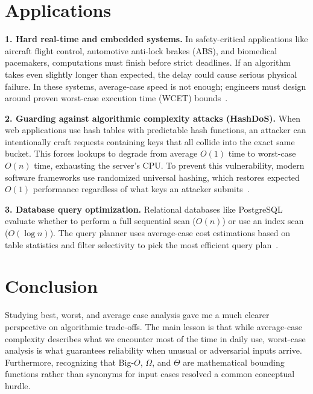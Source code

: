 \documentclass[11pt,a4paper]{article}
\begin{document}
\section{Applications}

\textbf{1. Hard real-time and embedded systems.}
In safety-critical applications like aircraft flight control, automotive anti-lock brakes (ABS), and biomedical pacemakers, computations must finish before strict deadlines. If an algorithm takes even slightly longer than expected, the delay could cause serious physical failure. In these systems, average-case speed is not enough; engineers must design around proven worst-case execution time (WCET) bounds~\cite{kleinberg2006}.

\textbf{2. Guarding against algorithmic complexity attacks (HashDoS).}
When web applications use hash tables with predictable hash functions, an attacker can intentionally craft requests containing keys that all collide into the exact same bucket. This forces lookups to degrade from average $O(1)$ time to worst-case $O(n)$ time, exhausting the server's CPU. To prevent this vulnerability, modern software frameworks use randomized universal hashing, which restores expected $O(1)$ performance regardless of what keys an attacker submits~\cite{cormen2022}.

\textbf{3. Database query optimization.}
Relational databases like PostgreSQL evaluate whether to perform a full sequential scan ($O(n)$) or use an index scan ($O(\log n)$). The query planner uses average-case cost estimations based on table statistics and filter selectivity to pick the most efficient query plan~\cite{sedgewick2011}.

\section{Conclusion}

Studying best, worst, and average case analysis gave me a much clearer perspective on algorithmic trade-offs. The main lesson is that while average-case complexity describes what we encounter most of the time in daily use, worst-case analysis is what guarantees reliability when unusual or adversarial inputs arrive. Furthermore, recognizing that Big-$O$, $\Omega$, and $\Theta$ are mathematical bounding functions rather than synonyms for input cases resolved a common conceptual hurdle.
\end{document}
